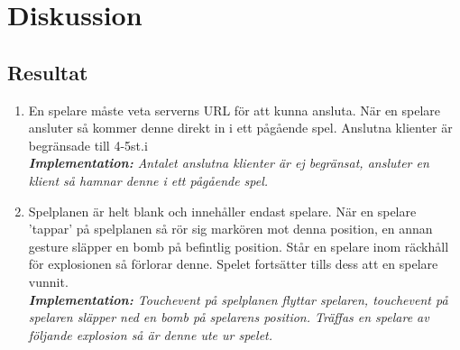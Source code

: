 \documentclass[10pt, titlepage, oneside, a4paper]{article}
\begin{document}
    \newpage
    \section{Diskussion}
    	\subsection{Resultat}
    	
    	\begin{enumerate}
			\item En spelare måste veta serverns URL för att kunna ansluta. När en spelare ansluter så kommer denne direkt in i ett pågående spel. Anslutna klienter är begränsade till 4-5st.i\\\textit{\textbf{Implementation:} Antalet anslutna klienter är ej begränsat, ansluter en klient så hamnar denne i ett pågående spel.}
			
			\item Spelplanen är helt blank och innehåller endast spelare. När en spelare 'tappar' på spelplanen så rör sig markören mot denna position, en annan gesture släpper en bomb på befintlig position. Står en spelare inom räckhåll för explosionen så förlorar denne. Spelet fortsätter tills dess att en spelare vunnit.\\\textit{\textbf{Implementation:} Touchevent på spelplanen flyttar spelaren, touchevent på spelaren släpper ned en bomb på spelarens position. Träffas en spelare av följande explosion så är denne ute ur spelet.}
			

\end{enumerate}
\end{document}
